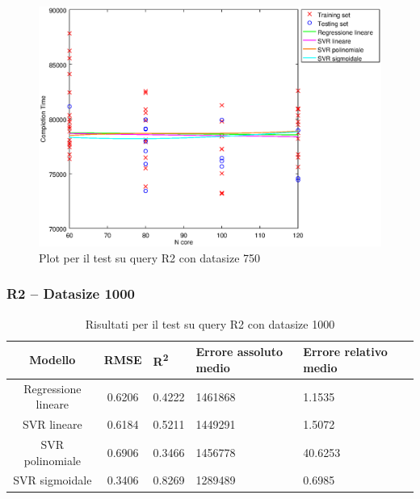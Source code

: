 \documentclass[a4paper,11pt]{article}
\begin{document}
\begin {figure}[hbtp]
\centering
\includegraphics[width=\textwidth]{output/R2_750/plot_R2_750.eps}
\caption {Plot per il test su query R2 con datasize 750}
\end {figure}
\newpage
\subsubsection{R2 -- Datasize 1000}
\begin{table}[bhpt]
	\centering
	\begin{adjustbox}{center}
		\begin{tabular}{c | c M{1cm} M{2.5cm} M{2.5cm} M{1.8cm}}
			Modello & RMSE & R\textsuperscript{2} & Errore assoluto medio & Errore relativo medio \tabularnewline
			\hline
			Regressione lineare & 0.6206 & 0.4222 & 1461868 & 1.1535 \\
			SVR lineare & 0.6184 & 0.5211 & 1449291 & 1.5072 \\
			SVR polinomiale & 0.6906 & 0.3466 & 1456778 & 40.6253 \\
			SVR sigmoidale & 0.3406 & 0.8269 & 1289489 & 0.6985 \\
		\end{tabular}
	\end{adjustbox}
	\\
	\caption{Risultati per il test su query R2 con datasize 1000}
	\label{table_R2_1000}
\end{table}
\end{document}
